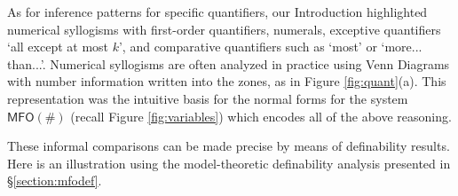 \documentclass[12pt,oneside,reqno]{amsart}
\theoremstyle{definition}
\begin{document}
\vspace{1ex}

As for inference patterns for specific quantifiers, our Introduction highlighted  numerical syllogisms with first-order quantifiers, numerals, exceptive quantifiers `all except  at most $k$', and comparative quantifiers such as `most' or `more... than...'. Numerical syllogisms are often analyzed in practice using Venn Diagrams with number information written into the zones, as in Figure \ref{fig:quant}(a).  This representation  was the intuitive basis for the normal forms for the system $\mathsf{MFO(\#)}$ (recall Figure \ref{fig:variables}) which encodes all of the above reasoning.




These informal comparisons can be made precise by means of  definability results. Here is an illustration using the model-theoretic definability analysis presented  in \S\ref{section:mfodef}.
\end{document}
